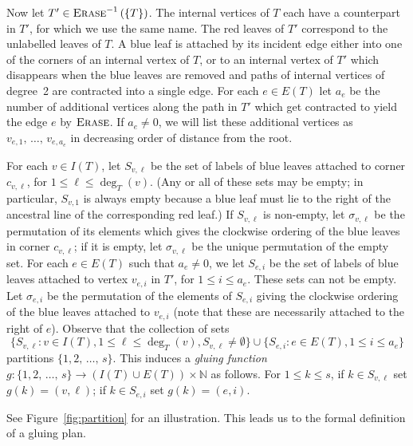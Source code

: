 \documentclass[AHL,Unicode,longabstracts,published]{cedram}
\newcommand{\N}{\mathbb{N}}
\begin{document}
Now let $T'\in \textsc{Erase}^{-1}\left(\{T\}\right)$. The internal vertices of $T$ each have a counterpart in $T'$, for which we use the same name. The red leaves of $T'$ correspond to the unlabelled leaves of $T$. A blue leaf is attached by its incident edge either into one of the corners of an internal vertex of $T$, or to an internal vertex of $T'$ which disappears when the blue leaves are removed and paths of internal vertices of degree~2 are contracted into a single edge. For each $e \in E(T)$ let $a_e$ be the number of additional vertices along the path in $T'$ which get contracted to yield the edge $e$ by $\textsc{Erase}$. If $a_e \neq 0$, we will list these additional vertices as $v_{e, 1}, \,\ldots,\,v_{e,a_e}$ in decreasing order of distance from the root.


For each $v \in I(T)$, let $S_{v, \ell}$ be the set of labels of blue leaves attached to corner $c_{v, \ell}$, for $1 \le \ell \le \deg_T(v)$. (Any or all of these sets may be empty; in particular, $S_{v,1}$ is always empty because a blue leaf must lie to the right of the ancestral line of the corresponding red leaf.) If $S_{v,\ell}$ is non-empty, let $\sigma_{v,\ell}$ be the permutation of its elements which gives the clockwise ordering of the blue leaves in corner $c_{v,\ell}$; if it is empty, let $\sigma_{v,\ell}$ be the unique permutation of the empty set. For each $e \in E(T)$ such that $a_e \neq 0$, we let $S_{e,i}$ be the set of labels of blue leaves attached to vertex $v_{e,i}$ in $T'$, for $1 \le i \le a_e$. These sets can not be empty. Let $\sigma_{e,i}$ be the permutation of the elements of $S_{e,i}$ giving the clockwise ordering of the blue leaves attached to $v_{e,i}$ (note that these are necessarily attached to the right of $e$). Observe that the collection of sets
\[
\big\{ S_{v,\ell} : v \in I(T), 1 \le \ell \le \deg_T(v), S_{v,\ell} \neq \emptyset\big\} \cup \big\{ S_{e,i}: e \in E(T), 1 \le i \le a_e\big\}
\]
partitions $\{1,2,\,\ldots,\,s\}$. This induces a \emph{gluing function} $g: \{1,2,\,\ldots,\,s\} \to (I(T) \cup E(T)) \times \N$ as follows. For $1 \le k \le s$, if $k \in S_{v,\ell}$ set $g(k) = (v,\ell)$; if $k \in S_{e,i}$ set $g(k) = (e,i)$.

See Figure~\ref{fig:partition} for an illustration. This leads us to the formal definition of a gluing plan.
\end{document}
